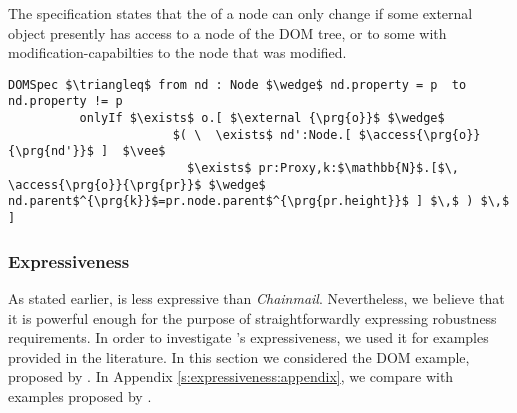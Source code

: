The specification  states that the  of a node can only change if
some external object presently has 
access to a node of the DOM tree, or to some  with modification-capabilties
to the node that was modified.
\begin{lstlisting}[language = Chainmail, mathescape=true, frame=lines]
DOMSpec $\triangleq$ from nd : Node $\wedge$ nd.property = p  to nd.property != p
          onlyIf $\exists$ o.[ $\external {\prg{o}}$ $\wedge$ 
                       $( \  \exists$ nd':Node.[ $\access{\prg{o}}{\prg{nd'}}$ ]  $\vee$ 
                         $\exists$ pr:Proxy,k:$\mathbb{N}$.[$\, \access{\prg{o}}{\prg{pr}}$ $\wedge$ nd.parent$^{\prg{k}}$=pr.node.parent$^{\prg{pr.height}}$ ] $\,$ ) $\,$ ]
\end{lstlisting}

\subsubsection{Expressiveness}
As stated earlier, \Nec is less expressive than
\emph{Chainmail}.
Nevertheless, we believe that
it  is powerful enough for the purpose of straightforwardly
expressing robustness requirements. 
In order to investigate \Nec's expressiveness,  
we used it for
examples provided in the literature. In this section we considered the DOM example, 
proposed by  \citeauthor{dd}. In Appendix \ref{s:expressiveness:appendix},
we compare with examples proposed by  \citeauthor{FASE}.
 

